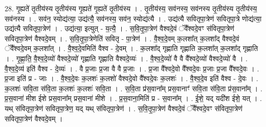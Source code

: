 \documentclass[17pt]{extarticle}
\begin{document}
28. गृ॒ह्यते॑ तृ॒तीय॑स्य तृ॒तीय॑स्य गृ॒ह्यते॑ गृ॒ह्यते॑ तृ॒तीय॑स्य । . तृ॒तीय॑स्य॒ सव॑नस्य॒ सव॑नस्य तृ॒तीय॑स्य तृ॒तीय॑स्य॒ सव॑नस्य । . सव॑न॒ स्योद्य॑त्या॒ उद्य॑त्यै॒ सव॑नस्य॒ सव॑न॒ स्योद्य॑त्यै । . उद्य॑त्यै सवितृपा॒त्रेण॑ सवितृपा॒त्रे णोद्य॑त्या॒ उद्य॑त्यै सवितृपा॒त्रेण॑ । . उद्य॑त्या॒ इत्युत् - य॒त्यै॒ । . स॒वि॒तृ॒पा॒त्रेण॑ वैश्वदे॒वं ॅवै᳚श्वदे॒वꣳ स॑वितृपा॒त्रेण॑ सवितृपा॒त्रेण॑ वैश्वदे॒वम् । . स॒वि॒तृ॒पा॒त्रेणेति॑ सवितृ - पा॒त्रेण॑ । . वै॒श्व॒दे॒वम् क॒लशा᳚त् क॒लशा᳚द् वैश्वदे॒वं ॅवै᳚श्वदे॒वम् क॒लशा᳚त् । . वै॒श्व॒दे॒वमिति॑ वैश्व - दे॒वम् । . क॒लशा᳚द् गृह्णाति गृह्णाति क॒लशा᳚त् क॒लशा᳚द् गृह्णाति । . गृ॒ह्णा॒ति॒ वै॒श्व॒दे॒व्यो॑ वैश्वदे॒व्यो॑ गृह्णाति गृह्णाति वैश्वदे॒व्यः॑ । . वै॒श्व॒दे॒व्यो॑ वै वै वै᳚श्वदे॒व्यो॑ वैश्वदे॒व्यो॑ वै । . वै॒श्व॒दे॒व्य॑ इति॑ वैश्व - दे॒व्यः॑ । . वै प्र॒जाः प्र॒जा वै वै प्र॒जाः । . प्र॒जा वै᳚श्वदे॒वो वै᳚श्वदे॒वः प्र॒जाः प्र॒जा वै᳚श्वदे॒वः । . प्र॒जा इति॑ प्र - जाः । . वै॒श्व॒दे॒वः क॒लशः॑ क॒लशो॑ वैश्वदे॒वो वै᳚श्वदे॒वः क॒लशः॑ । . वै॒श्व॒दे॒व इति॑ वैश्व - दे॒वः । . क॒लशः॑ सवि॒ता स॑वि॒ता क॒लशः॑ क॒लशः॑ सवि॒ता । . स॒वि॒ता प्र॑स॒वाना᳚म् प्रस॒वानाꣳ॑ सवि॒ता स॑वि॒ता प्र॑स॒वाना᳚म् । . प्र॒स॒वाना॑ मीश ईशे प्रस॒वाना᳚म् प्रस॒वाना॑ मीशे । . प्र॒स॒वाना॒मिति॑ प्र - स॒वाना᳚म् । . ई॒शे॒ यद् यदी॑श ईशे॒ यत् । . यथ् स॑वितृपा॒त्रेण॑ सवितृपा॒त्रेण॒ यद् यथ् स॑वितृपा॒त्रेण॑ । . स॒वि॒तृ॒पा॒त्रेण॑ वैश्वदे॒वं ॅवै᳚श्वदे॒वꣳ स॑वितृपा॒त्रेण॑ सवितृपा॒त्रेण॑ वैश्वदे॒वम् । \newline
\end{document}
